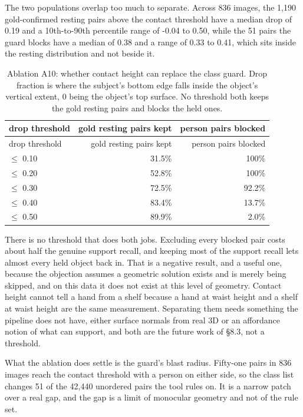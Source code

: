 The two populations overlap too much to separate. Across 836 images, the 1,190 gold-confirmed resting pairs above the contact threshold have a median drop of 0.19 and a 10th-to-90th percentile range of -0.04 to 0.50, while the 51 pairs the guard blocks have a median of 0.38 and a range of 0.33 to 0.41, which sits inside the resting distribution and not beside it.

\begin{center}
\setlength{\tabcolsep}{6pt}
\small
\begin{longtable}{lrr}
\caption[Ablation A10: whether contact height can replace the class]{Ablation A10: whether contact height can replace the class guard. Drop fraction is where the subject's bottom edge falls inside the object's vertical extent, 0 being the object's top surface. No threshold both keeps the gold resting pairs and blocks the held ones.}\\
\hline
drop threshold & gold resting pairs kept & person pairs blocked \\
\hline
\endfirsthead
\hline
drop threshold & gold resting pairs kept & person pairs blocked \\
\hline
\endhead
$\leq$ 0.10 & 31.5\% & 100\% \\
$\leq$ 0.20 & 52.8\% & 100\% \\
$\leq$ 0.30 & 72.5\% & 92.2\% \\
$\leq$ 0.40 & 83.4\% & 13.7\% \\
$\leq$ 0.50 & 89.9\% & 2.0\% \\
\hline
\end{longtable}
\end{center}

There is no threshold that does both jobs. Excluding every blocked pair costs about half the genuine support recall, and keeping most of the support recall lets almost every held object back in. That is a negative result, and a useful one, because the objection assumes a geometric solution exists and is merely being skipped, and on this data it does not exist at this level of geometry. Contact height cannot tell a hand from a shelf because a hand at waist height and a shelf at waist height are the same measurement. Separating them needs something the pipeline does not have, either surface normals from real 3D or an affordance notion of what can support, and both are the future work of \S{}8.3, not a threshold.

What the ablation does settle is the guard's blast radius. Fifty-one pairs in 836 images reach the contact threshold with a person on either side, so the class list changes 51 of the 42,440 unordered pairs the tool rules on. It is a narrow patch over a real gap, and the gap is a limit of monocular geometry and not of the rule set.


